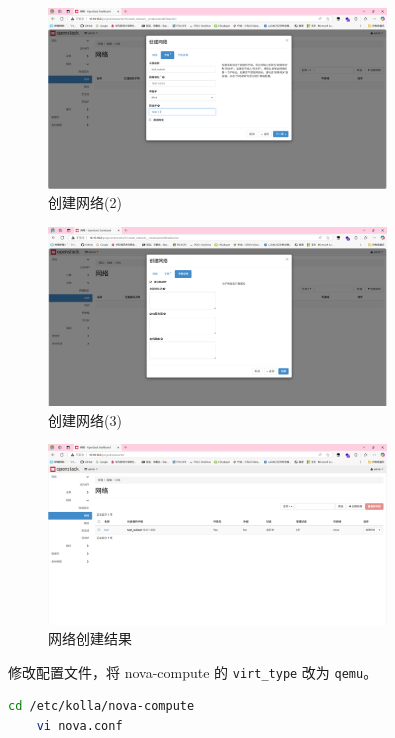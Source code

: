 \documentclass{article}
\begin{document}
\begin{figure}[H]
    \centering
    \includegraphics[width=0.8\textwidth]{img/10.2.png}
    \caption{创建网络(2)}
\end{figure}

\begin{figure}[H]
    \centering
    \includegraphics[width=0.8\textwidth]{img/10.3.png}
    \caption{创建网络(3)}
\end{figure}

\begin{figure}[H]
    \centering
    \includegraphics[width=0.8\textwidth]{img/10.4.png}
    \caption{网络创建结果}
\end{figure}

修改配置文件，将 nova-compute 的 \texttt{virt\_type} 改为 \texttt{qemu}。

\begin{lstlisting}[language=bash]
    cd /etc/kolla/nova-compute
    vi nova.conf
\end{lstlisting}
\end{document}

